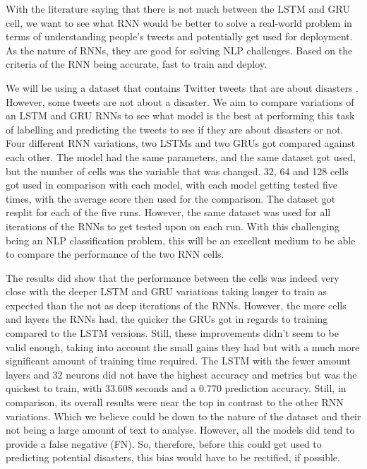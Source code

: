 \documentclass[a4paper,10pt]{article}
\begin{document}
	With the literature saying that there is not much between the LSTM and GRU cell, we want to see what RNN would be better to solve a real-world problem in terms of understanding people's tweets and potentially get used for deployment. As the nature of RNNs, they are good for solving NLP challenges. Based on the criteria of the RNN being accurate, fast to train and deploy.

	We will be using a dataset that contains Twitter tweets that are about disasters \cite{disater_kaggle}. However, some tweets are not about a disaster. We aim to compare variations of an LSTM and GRU RNNs to see what model is the best at performing this task of labelling and predicting the tweets to see if they are about disasters or not. Four different RNN variations, two LSTMs and two GRUs got compared against each other. The model had the same parameters, and the same dataset got used, but the number of cells was the variable that was changed. 32, 64 and 128 cells got used in comparison with each model, with each model getting tested five times, with the average score then used for the comparison. The dataset got resplit for each of the five runs. However, the same dataset was used for all iterations of the RNNs to get tested upon on each run. With this challenging being an NLP classification problem, this will be an excellent medium to be able to compare the performance of the two RNN cells.  
	
	The results did show that the performance between the cells was indeed very close with the deeper LSTM and GRU variations taking longer to train as expected than the not as deep iterations of the RNNs. However, the more cells and layers the RNNs had, the quicker the GRUs got in regards to training compared to the LSTM versions. Still, these improvements didn't seem to be valid enough, taking into account the small gains they had but with a much more significant amount of training time required. The LSTM with the fewer amount layers and 32 neurons did not have the highest accuracy and metrics but was the quickest to train, with 33.608 seconds and a 0.770 prediction accuracy. Still, in comparison, its overall results were near the top in contrast to the other RNN variations. Which we believe could be down to the nature of the dataset and their not being a large amount of text to analyse. However, all the models did tend to provide a false negative (FN). So, therefore, before this could get used to predicting potential disasters, this bias would have to be rectified, if possible.
\end{document}
